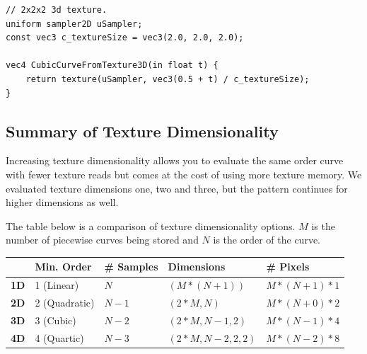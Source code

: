 \documentclass{jcgt}
\begin{document}
\begin{lstlisting}[caption={GLSL for evaluating a cubic curve encoded in a $(2,2,2)$ pixel 3d texture.  Trilinear texture sampling used to evaluate all three levels of the De Casteljeau algorithm.}, label={lst:GLSLCubicTexture3D}]
// 2x2x2 3d texture.
uniform sampler2D uSampler; 
const vec3 c_textureSize = vec3(2.0, 2.0, 2.0);

vec4 CubicCurveFromTexture3D(in float t) {
    return texture(uSampler, vec3(0.5 + t) / c_textureSize);
}
\end{lstlisting} 

\subsection{Summary of Texture Dimensionality}

Increasing texture dimensionality allows you to evaluate the same order curve with fewer texture reads but comes at the cost of using more texture memory.  We evaluated texture dimensions one, two and three, but the pattern continues for higher dimensions as well.

The table below is a comparison of texture dimensionality options.  $M$ is the number of piecewise curves being stored and $N$ is the order of the curve.

\begin{tabular}{|l|l|l|l|l|}
\hline
 & \bf{Min. Order} & \bf{\# Samples} & \bf{Dimensions} & \bf{\# Pixels} \\ \hline
\bf{1D} & 1 (Linear) & $N$ & $(M*(N+1))$ & $M*(N+1)*1$ \\ \hline
\bf{2D} & 2 (Quadratic) & $N-1$ & $(2*M,N)$ & $M*(N+0)*2$\\ \hline
\bf{3D} & 3 (Cubic) & $N-2$ & $(2*M,N-1,2)$ & $M*(N-1)*4$\\ \hline
\bf{4D} & 4 (Quartic) & $N-3$ & $(2*M,N-2,2,2)$ & $M*(N-2)*8$\\ \hline
\end{tabular}
\end{document}
